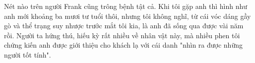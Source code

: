 Nét nào trên người Frank cũng trông bệnh tật cả. Khi tôi gặp anh thì hình như anh mới khoảng ba mươi tư tuổi thôi, nhưng tôi không nghĩ, từ cái vóc dáng gầy gò và thể trạng suy nhược trước mắt tôi kia, là anh đã sống qua được vài năm rồi. Người ta hứng thú, hiếu kỳ rất nhiều về nhân vật này, mà nhiều phen tôi chứng kiến anh được giới thiệu cho khách lạ với cái danh "nhìn ra được những người tốt tính".